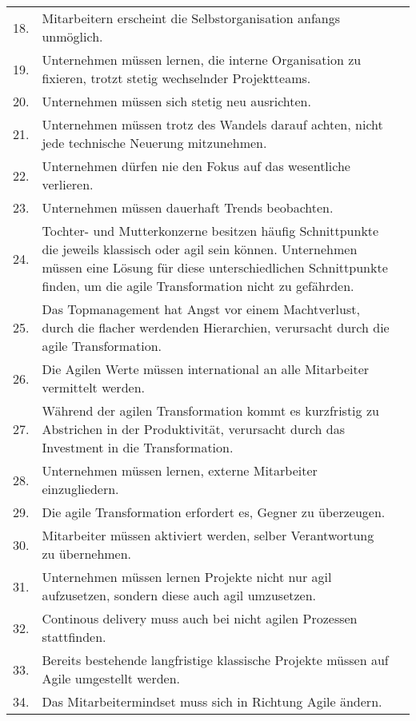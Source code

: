 \begin{longtable}{|p{}|p{5cm}|p{}|}
	&
	\\ \hline
	18. & Mitarbeitern erscheint die Selbstorganisation anfangs unmöglich.
	&
	\\ \hline
	19. & Unternehmen müssen lernen, die interne Organisation zu fixieren, trotzt stetig wechselnder Projektteams.
	&
	\\ \hline
	20. & Unternehmen müssen sich stetig neu ausrichten.
	&
	\\ \hline
	21. & Unternehmen müssen trotz des Wandels darauf achten, nicht jede technische Neuerung mitzunehmen.
	&
	\\ \hline
	22. & Unternehmen dürfen nie den Fokus auf das wesentliche verlieren.
	&
	\\ \hline
	23. & Unternehmen müssen dauerhaft Trends beobachten.
	&
	\\ \hline
	24. & Tochter- und Mutterkonzerne besitzen häufig Schnittpunkte die jeweils klassisch oder agil sein können. Unternehmen müssen eine Lösung für diese unterschiedlichen Schnittpunkte finden, um die agile Transformation nicht zu gefährden.
	&
	\\ \hline
	25. & Das Topmanagement hat Angst vor einem Machtverlust, durch die flacher werdenden Hierarchien, verursacht durch die agile Transformation.
	&
	\\ \hline
	26. & Die Agilen Werte müssen international an alle Mitarbeiter vermittelt werden.
	&
	\\ \hline
	27. & Während der agilen Transformation kommt es kurzfristig zu Abstrichen in der Produktivität, verursacht durch das Investment in die Transformation.
	&
	\\ \hline
	28. & Unternehmen müssen lernen, externe Mitarbeiter einzugliedern.
	&
	\\ \hline
	29. & Die agile Transformation erfordert es, Gegner zu überzeugen.
	&
	\\ \hline
	30. & Mitarbeiter müssen aktiviert werden, selber Verantwortung zu übernehmen.
	&
	\\ \hline
	31. & Unternehmen müssen lernen Projekte nicht nur agil aufzusetzen, sondern diese auch agil umzusetzen.
	&
	\\ \hline
	32. & Continous delivery muss auch bei nicht agilen Prozessen stattfinden.
	&
	\\ \hline
	33. & Bereits bestehende langfristige klassische Projekte müssen auf Agile umgestellt werden.
	&
	\\ \hline
	34. & Das Mitarbeitermindset muss sich in Richtung Agile ändern.
	&
	\\ \hline

\end{longtable}
